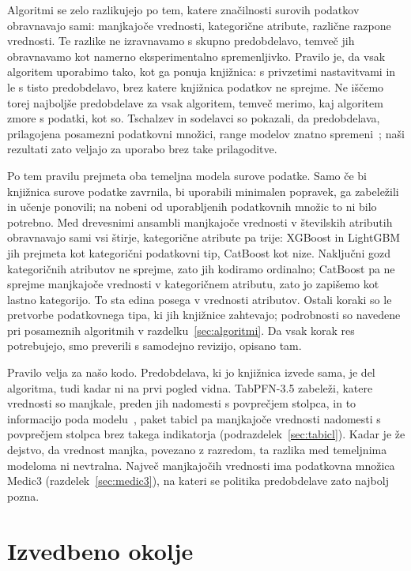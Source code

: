 \documentclass[a4paper,12pt,openright]{book}
\begin{document}
Algoritmi se zelo razlikujejo po tem, katere značilnosti surovih podatkov
obravnavajo sami: manjkajoče vrednosti, kategorične atribute, različne
razpone vrednosti. Te razlike ne izravnavamo s skupno predobdelavo, temveč jih
obravnavamo kot namerno eksperimentalno spremenljivko. Pravilo je, da vsak
algoritem uporabimo tako, kot ga ponuja knjižnica: s privzetimi nastavitvami in
le s tisto predobdelavo, brez katere knjižnica podatkov ne sprejme. Ne iščemo
torej najboljše predobdelave za vsak algoritem, temveč merimo, kaj algoritem
zmore s podatki, kot so. Tschalzev in sodelavci so pokazali, da predobdelava,
prilagojena posamezni podatkovni množici, range modelov znatno
spremeni~\cite{tschalzev2024data}; naši rezultati zato veljajo za uporabo brez
take prilagoditve.

Po tem pravilu prejmeta oba temeljna modela surove podatke. Samo če bi
knjižnica surove podatke zavrnila, bi uporabili minimalen popravek, ga zabeležili
in učenje ponovili; na nobeni od uporabljenih podatkovnih množic to ni bilo
potrebno. Med drevesnimi ansambli manjkajoče vrednosti v številskih atributih
obravnavajo sami vsi štirje, kategorične atribute pa trije: XGBoost in LightGBM
jih prejmeta kot kategorični podatkovni tip, CatBoost kot nize. Naključni gozd
kategoričnih atributov ne sprejme, zato jih kodiramo ordinalno; CatBoost pa ne
sprejme manjkajoče vrednosti v kategoričnem atributu, zato jo zapišemo kot
lastno kategorijo. To sta edina posega v vrednosti atributov. Ostali koraki so
le pretvorbe podatkovnega tipa, ki jih knjižnice zahtevajo; podrobnosti so
navedene pri posameznih algoritmih v razdelku~\ref{sec:algoritmi}. Da vsak
korak res potrebujejo, smo preverili s samodejno revizijo, opisano tam.

Pravilo velja za našo kodo. Predobdelava, ki jo knjižnica izvede sama, je del
algoritma, tudi kadar ni na prvi pogled vidna. TabPFN-3.5 zabeleži, katere
vrednosti so manjkale, preden jih nadomesti s povprečjem stolpca, in to
informacijo poda modelu~\cite{jager2026tabpfn35}, paket tabicl pa manjkajoče
vrednosti nadomesti s povprečjem stolpca brez takega indikatorja
(podrazdelek~\ref{sec:tabicl}).
Kadar je že dejstvo, da vrednost manjka, povezano z razredom, ta razlika med
temeljnima modeloma ni nevtralna. Največ manjkajočih vrednosti ima podatkovna
množica Medic3 (razdelek~\ref{sec:medic3}), na kateri se politika predobdelave
zato najbolj pozna.

\section{Izvedbeno okolje}
\label{sec:okolje}
\end{document}
